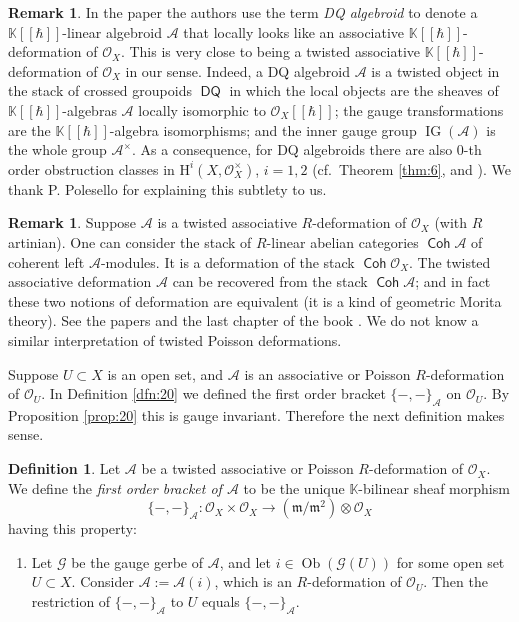 \documentclass[a4paper, 10pt]{amsart}
\theoremstyle{definition}
\newtheorem{dfn}[equation]{Definition}
\newtheorem{rem}[equation]{Remark}
\numberwithin{equation}{section}
\newcommand{\opn}{\operatorname}
\newcommand{\cat}[1]{\operatorname{\mathsf{#1}}}
\newcommand{\rmitem}[1]{\item[\text{\textup{(#1)}}]}
\newcommand{\mfrak}[1]{\mathfrak{#1}}
\newcommand{\mcal}[1]{\mathcal{#1}}
\newcommand{\mrm}[1]{\mathrm{#1}}
\newcommand{\mbb}[1]{\mathbb{#1}}
\newcommand{\bsym}[1]{\boldsymbol{#1}}
\newcommand{\ot}{\otimes}
\newcommand{\K}{\mbb{K}}
\newcommand{\m}{\mfrak{m}}
\newcommand{\OX}{\mcal{O}_X}
\newcommand{\gerbe}[1]{\bsym{\mcal{#1}}}
\newcommand{\twocat}[1]{\operatorname{\bsym{\cat{#1}}}}
\begin{document}
\begin{rem} \label{rem:6}
In the paper \cite{KS2} the authors use the term {\em DQ algebroid} 
to denote a $\K[[\hbar]]$-linear algebroid $\gerbe{A}$ that locally looks like
an associative $\K[[\hbar]]$-deformation of $\mcal{O}_X$.
This is very close to being a twisted associative $\K[[\hbar]]$-deformation of
$\mcal{O}_X$ in our sense.
Indeed, a DQ algebroid $\gerbe{A}$ is a twisted object in the stack of crossed
groupoids $\twocat{DQ}$ in which the local objects are the sheaves
of $\K[[\hbar]]$-algebras $\mcal{A}$ locally isomorphic to $\OX[[\hbar]]$; 
the gauge transformations are the $\K[[\hbar]]$-algebra isomorphisms;
and the inner gauge group $\opn{IG}(\mcal{A})$ is the whole group
$\mcal{A}^{\times}$.
As a consequence, for DQ algebroids there are also $0$-th order
obstruction classes in $\mrm{H}^i(X, \mcal{O}_X^{\times})$,
$i = 1, 2$ (cf.\ Theorem
\ref{thm:6}, and \cite[Theorems 4.6 and 4.17]{Ye4}). We thank P.
Polesello for explaining this subtlety to us.
\end{rem}

\begin{rem}
Suppose $\gerbe{A}$ is a twisted associative $R$-deformation of
$\mcal{O}_X$ (with $R$ artinian). One can consider the stack of $R$-linear
abelian categories $\twocat{Coh} \gerbe{A}$ of coherent left
$\gerbe{A}$-modules. It is a deformation of the stack 
$\twocat{Coh} \mcal{O}_X$. The twisted associative deformation 
$\gerbe{A}$ can be recovered from the stack $\twocat{Coh} \gerbe{A}$;
and in fact these two notions of deformation are equivalent
(it is a kind of geometric Morita theory).
See the papers \cite{Ko2, LV, Lo, KS2, DP2} and the last chapter of the
book \cite{KS1}.
We do not know a similar interpretation of twisted Poisson
deformations.
\end{rem}

Suppose $U \subset X$ is an open set, and $\mcal{A}$ is an
associative or Poisson $R$-deformation of $\mcal{O}_U$. 
In Definition \ref{dfn:20} we defined the first order bracket
$\{ -,- \}_{\mcal{A}}$ on $\mcal{O}_U$. 
By Proposition \ref{prop:20} this is gauge invariant. Therefore the
next definition makes sense.

\begin{dfn} \label{dfn:22}
Let $\gerbe{A}$ be a twisted associative or
Poisson $R$-deformation of $\mcal{O}_X$. 
We define the {\em first order bracket of $\gerbe{A}$}
to be the unique $\K$-bilinear sheaf morphism
\[ \{ -,- \}_{\gerbe{A}} : 
\mcal{O}_X \times \mcal{O}_X \to (\m / \m^2) \ot  \mcal{O}_X
\]
having this property:
\begin{enumerate}
\rmitem{$*$} Let $\gerbe{G}$ be the gauge gerbe of $\gerbe{A}$, and let 
$i \in \opn{Ob} (\gerbe{G}(U))$ for some open set 
$U \subset X$. Consider $\mcal{A} := \gerbe{A}(i)$, which is an 
$R$-deformation of $\mcal{O}_U$. Then the restriction of
$\{ -,- \}_{\gerbe{A}}$ to $U$ equals 
$\{ -,- \}_{\mcal{A}}$. 
\end{enumerate}
\end{dfn}
\end{document}
